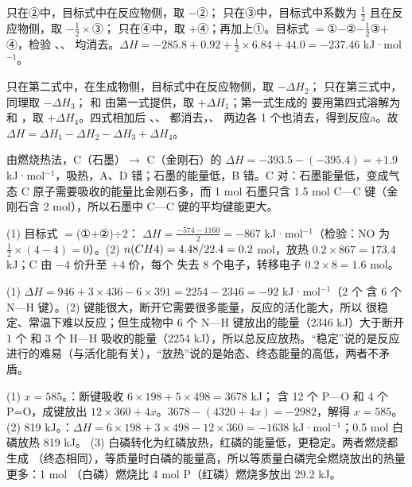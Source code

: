 \begin{jiexilist}
\item {} 只在②中，目标式中在反应物侧，取 $-$②； 只在③中，目标式中系数为 $\frac12$ 且在反应物侧，取 $-\frac12\times$③； 只在④中，取 $+$④；再加上①。目标式 $=$①$-$②$-\frac12$③$+$④，检验 、、 均消去。$\Delta H=-285.8+0.92+\frac12\times6.84+44.0=-237.46$ kJ·mol$^{-1}$。
\item {} 只在第二式中，在生成物侧，目标式中在反应物侧，取 $-\Delta H_2$； 只在第三式中，同理取 $-\Delta H_3$； 和  由第一式提供，取 $+\Delta H_1$；第一式生成的  要用第四式溶解为  和 ，取 $+\Delta H_4$。四式相加后 、、 都消去，、 两边各 1 个也消去，得到反应a。故 $\Delta H=\Delta H_1-\Delta H_2-\Delta H_3+\Delta H_4$。
\item {}由燃烧热法，C（石墨）$\to$ C（金刚石）的 $\Delta H=-393.5-(-395.4)=+1.9$ kJ·mol$^{-1}$，吸热，A、D 错；石墨的能量低，B 错。C 对：石墨能量低，变成气态 C 原子需要吸收的能量比金刚石多，而 1 mol 石墨只含 1.5 mol C—C 键（金刚石含 2 mol），所以石墨中 C—C 键的平均键能更大。
\item (1) 目标式 $=$(①$+$②)$\div2$： $\Delta H=\frac{-574-1160}{2}=-867$ kJ·mol$^{-1}$（检验：NO 为 $\frac12\times(4-4)=0$）。(2) $n(CH4)=4.48/22.4=0.2$ mol，放热 $0.2\times867=173.4$ kJ；C 由 $-4$ 价升至 $+4$ 价，每个  失去 8 个电子，转移电子 $0.2\times8=1.6$ mol。
\item (1) $\Delta H=946+3\times436-6\times391=2254-2346=-92$ kJ·mol$^{-1}$（2 个  含 6 个 N—H 键）。(2)  键能很大，断开它需要很多能量，反应的活化能大，所以  很稳定、常温下难以反应；但生成物中 6 个 N—H 键放出的能量（2346 kJ）大于断开 1 个  和 3 个 H—H 吸收的能量（2254 kJ），所以总反应放热。“稳定”说的是反应进行的难易（与活化能有关），“放热”说的是始态、终态能量的高低，两者不矛盾。
\item (1) $x=585$。：断键吸收 $6\times198+5\times498=3678$ kJ； 含 12 个 P—O 和 4 个 P=O，成键放出 $12\times360+4x$。$3678-(4320+4x)=-2982$，解得 $x=585$。
(2) 819 kJ。：$\Delta H=6\times198+3\times498-12\times360=-1638$ kJ·mol$^{-1}$；0.5 mol 白磷放热 819 kJ。
(3) 白磷转化为红磷放热，红磷的能量低，更稳定。两者燃烧都生成 （终态相同），等质量时白磷的能量高，所以等质量白磷完全燃烧放出的热量更多：1 mol （白磷）燃烧比 4 mol P（红磷）燃烧多放出 29.2 kJ。

\end{jiexilist}
